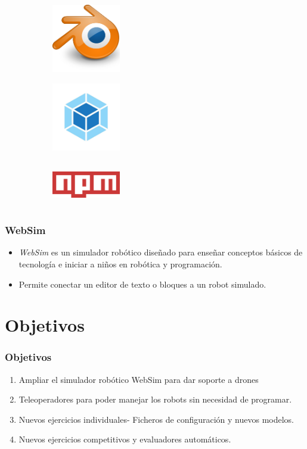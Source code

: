 \documentclass[xcolor={table}]{beamer}
\begin{document}
\begin{frame}
\begin{figure}[H]
\begin{subfigure}{\textwidth}
    \includegraphics[width=3cm, height=3cm]{img/blender.png}
\label{fig:figure2_7}
\end{subfigure}\hfill
    \begin{subfigure}{\textwidth}
        \includegraphics[width=3cm, height=3cm]{img/webpack.jpeg}
    \label{fig:figure2_9}
    \end{subfigure}\hfill
    \begin{subfigure}{\textwidth}
        \includegraphics[width=3cm, height=2cm]{img/npm.png}
    \label{fig:figure2_8}
    \end{subfigure}\hfill
    \label{fig:secuenciaDrone}
    \end{figure}
\end{frame}
	\begin{frame}
	\frametitle{WebSim}
	\begin{itemize}
	    \item \textit{WebSim} es un simulador robótico diseñado para enseñar conceptos básicos de tecnología e iniciar a niños en robótica y programación.
	    
	    \item Permite conectar un editor de texto o bloques a un robot simulado. 
	\end{itemize}
\end{frame}
		
	\section{Objetivos}
		\begin{frame}
			\frametitle{Objetivos}
			\begin{enumerate}
				\item Ampliar el simulador robótico WebSim para dar soporte a drones
				\item Teleoperadores para poder manejar los robots sin necesidad de programar.
				\item Nuevos ejercicios individuales- Ficheros de configuración y nuevos modelos.
				\item Nuevos ejercicios competitivos y evaluadores automáticos. 
			\end{enumerate}
		\end{frame}
\end{document}
